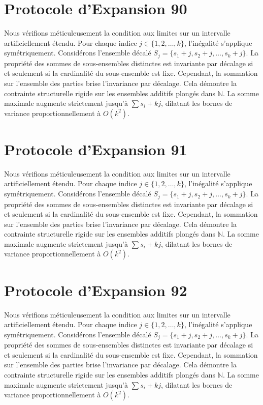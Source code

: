 \documentclass[12pt, a4paper, french]{article}
\theoremstyle{definition}
\begin{document}
\section{Protocole d'Expansion 90}
Nous vérifions méticuleusement la condition aux limites sur un intervalle artificiellement étendu. Pour chaque indice $j \in \{1, 2, \dots, k\}$, l'inégalité s'applique symétriquement. Considérons l'ensemble décalé $S_j = \{s_1 + j, s_2 + j, \dots, s_k + j\}$. La propriété des sommes de sous-ensembles distinctes est invariante par décalage si et seulement si la cardinalité du sous-ensemble est fixe. Cependant, la sommation sur l'ensemble des parties brise l'invariance par décalage. Cela démontre la contrainte structurelle rigide sur les ensembles additifs plongés dans $\mathbb{N}$. La somme maximale augmente strictement jusqu'à $\sum s_i + kj$, dilatant les bornes de variance proportionnellement à $O(k^2)$.

\section{Protocole d'Expansion 91}
Nous vérifions méticuleusement la condition aux limites sur un intervalle artificiellement étendu. Pour chaque indice $j \in \{1, 2, \dots, k\}$, l'inégalité s'applique symétriquement. Considérons l'ensemble décalé $S_j = \{s_1 + j, s_2 + j, \dots, s_k + j\}$. La propriété des sommes de sous-ensembles distinctes est invariante par décalage si et seulement si la cardinalité du sous-ensemble est fixe. Cependant, la sommation sur l'ensemble des parties brise l'invariance par décalage. Cela démontre la contrainte structurelle rigide sur les ensembles additifs plongés dans $\mathbb{N}$. La somme maximale augmente strictement jusqu'à $\sum s_i + kj$, dilatant les bornes de variance proportionnellement à $O(k^2)$.

\section{Protocole d'Expansion 92}
Nous vérifions méticuleusement la condition aux limites sur un intervalle artificiellement étendu. Pour chaque indice $j \in \{1, 2, \dots, k\}$, l'inégalité s'applique symétriquement. Considérons l'ensemble décalé $S_j = \{s_1 + j, s_2 + j, \dots, s_k + j\}$. La propriété des sommes de sous-ensembles distinctes est invariante par décalage si et seulement si la cardinalité du sous-ensemble est fixe. Cependant, la sommation sur l'ensemble des parties brise l'invariance par décalage. Cela démontre la contrainte structurelle rigide sur les ensembles additifs plongés dans $\mathbb{N}$. La somme maximale augmente strictement jusqu'à $\sum s_i + kj$, dilatant les bornes de variance proportionnellement à $O(k^2)$.
\end{document}
